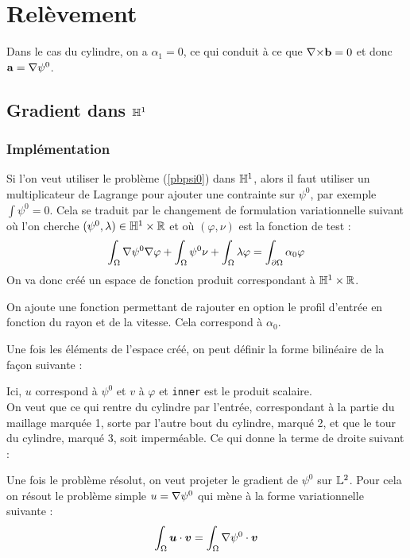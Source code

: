 \chapter{Relèvement}
Dans le cas du cylindre, on a $\alpha_1=0$, ce qui conduit à ce que ${\nabla\times} \mathbf{b}=0$ et donc $\mathbf{a}={\nabla}\psi^0$.

\section{Gradient dans ${\mathbb{H}}^1$}
\label{impGradh1}
\subsection{Implémentation}
Si l'on veut utiliser le problème (\ref{pbpsi0}) dans ${\mathbb{H}}^1$, alors il faut utiliser un multiplicateur de Lagrange pour ajouter une contrainte sur $\psi^0$, par exemple $\int \psi^0 = 0$. Cela se traduit par le changement de formulation variationnelle suivant où l'on cherche $(\psi^0,\lambda)\in {\mathbb{H}}^1\times{\mathbb{R}}$ et où $(\varphi,\nu)$ est la fonction de test :
\[ \int_\Omega{\nabla} \psi^0{\nabla}\varphi + \int_\Omega \psi^0\nu + \int_\Omega \lambda\varphi = \int_{\partial\Omega} \alpha_0\varphi \]
On va donc créé un espace de fonction produit correspondant à ${\mathbb{H}}^1\times{\mathbb{R}}$.



On ajoute une fonction permettant de rajouter en option le profil d'entrée en fonction du rayon et de la vitesse. Cela correspond à $\alpha_0$.



Une fois les éléments de l'espace créé, on peut définir la forme bilinéaire de la façon suivante :



Ici, $u$ correspond à $\psi^0$ et $v$ à $\varphi$ et \texttt{inner} est le produit scalaire.\\

On veut que ce qui rentre du cylindre par l'entrée, correspondant à la partie du maillage marquée 1, sorte par l'autre bout du cylindre, marqué 2, et que le tour du cylindre, marqué 3, soit imperméable. Ce qui donne la terme de droite suivant :



Une fois le problème résolut, on veut projeter le gradient de $\psi^0$ sur ${\mathbb{L}}^2$. Pour cela on résout le problème simple $u={\nabla}\psi^0$ qui mène à la forme variationnelle suivante :
\[ \int_\Omega \bm{u}\cdot\bm{v} = \int_\Omega {\nabla}\psi^0\cdot\bm{v} \]

